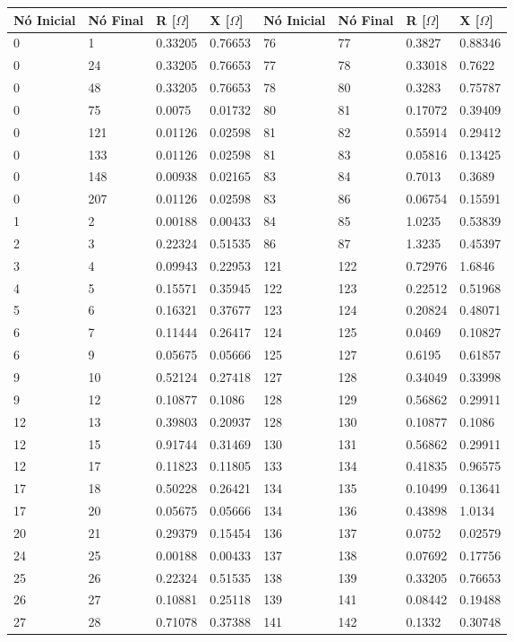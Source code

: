 \begin{tabular}{llllllll}
\toprule
\textbf{Nó Inicial}&\textbf{Nó Final}&\textbf{R [$\Omega$]}&\textbf{X [$\Omega$]}&\textbf{Nó Inicial}&\textbf{Nó Final}&\textbf{R [$\Omega$]}&\textbf{X [$\Omega$]}\\
\midrule
0&1&0.33205&0.76653&76&77&0.3827&0.88346\\
0&24&0.33205&0.76653&77&78&0.33018&0.7622\\
0&48&0.33205&0.76653&78&80&0.3283&0.75787\\
0&75&0.0075&0.01732&80&81&0.17072&0.39409\\
0&121&0.01126&0.02598&81&82&0.55914&0.29412\\
0&133&0.01126&0.02598&81&83&0.05816&0.13425\\
0&148&0.00938&0.02165&83&84&0.7013&0.3689\\
0&207&0.01126&0.02598&83&86&0.06754&0.15591\\
1&2&0.00188&0.00433&84&85&1.0235&0.53839\\
2&3&0.22324&0.51535&86&87&1.3235&0.45397\\
3&4&0.09943&0.22953&121&122&0.72976&1.6846\\
4&5&0.15571&0.35945&122&123&0.22512&0.51968\\
5&6&0.16321&0.37677&123&124&0.20824&0.48071\\
6&7&0.11444&0.26417&124&125&0.0469&0.10827\\
6&9&0.05675&0.05666&125&127&0.6195&0.61857\\
9&10&0.52124&0.27418&127&128&0.34049&0.33998\\
9&12&0.10877&0.1086&128&129&0.56862&0.29911\\
12&13&0.39803&0.20937&128&130&0.10877&0.1086\\
12&15&0.91744&0.31469&130&131&0.56862&0.29911\\
12&17&0.11823&0.11805&133&134&0.41835&0.96575\\
17&18&0.50228&0.26421&134&135&0.10499&0.13641\\
17&20&0.05675&0.05666&134&136&0.43898&1.0134\\
20&21&0.29379&0.15454&136&137&0.0752&0.02579\\
24&25&0.00188&0.00433&137&138&0.07692&0.17756\\
25&26&0.22324&0.51535&138&139&0.33205&0.76653\\
26&27&0.10881&0.25118&139&141&0.08442&0.19488\\
27&28&0.71078&0.37388&141&142&0.1332&0.30748\\

\end{tabular}
